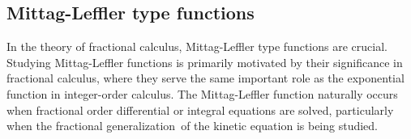 \documentclass[a4paper,12pt]{article}
\theoremstyle{remark}
\begin{document}
	
\subsection{Mittag-Leffler type functions } 
In the theory of fractional calculus, Mittag-Leffler type functions are crucial. Studying Mittag-Leffler functions is primarily motivated by their significance in fractional calculus, where they serve the same important role as the exponential function in integer-order calculus.
The Mittag-Leffler function naturally occurs when fractional order differential or integral equations are solved, particularly when the fractional generalization of the kinetic equation is being studied.
\end{document}
